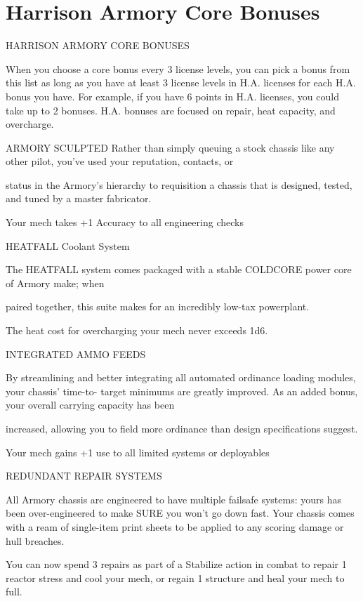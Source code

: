 \section{Harrison Armory Core Bonuses}

                           HARRISON ARMORY CORE BONUSES  

When you choose a core bonus every 3 license levels, you can pick a bonus from this list as long  
as you have at least 3 license levels in H.A. licenses for each H.A. bonus you have. For example,  
if you have 6 points in H.A. licenses, you could take up to 2 bonuses. H.A. bonuses are focused  
on repair, heat capacity, and overcharge.
 

ARMORY SCULPTED  
Rather than simply queuing a stock chassis like any other pilot, you’ve used your reputation, contacts, or  

status in the Armory’s hierarchy to requisition a chassis that is designed, tested, and tuned by a master  
fabricator.    

Your mech takes +1 Accuracy to all engineering checks
 

HEATFALL Coolant System  

The HEATFALL system comes packaged with a stable COLDCORE power core of Armory make; when  

paired together, this suite makes for an incredibly low-tax powerplant.   

The heat cost for overcharging your mech never exceeds 1d6.
 

INTEGRATED AMMO FEEDS  

By streamlining and better integrating all automated ordinance loading modules, your chassis’ time-to- 
target minimums are greatly improved. As an added bonus, your overall carrying capacity has been  

increased, allowing you to field more ordinance than design specifications suggest.    

Your mech gains +1 use to all limited systems or deployables
 

REDUNDANT REPAIR SYSTEMS  

All Armory chassis are engineered to have multiple failsafe systems: yours has been over-engineered to  
make SURE you won’t go down fast. Your chassis comes with a ream of single-item print sheets to be  
applied to any scoring damage or hull breaches.    

You can now spend 3 repairs as part of a Stabilize action in combat to repair 1 reactor stress and  
cool your mech, or regain 1 structure and heal your mech to full.
 


